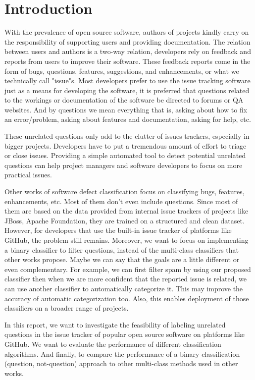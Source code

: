 \documentclass[conference]{IEEEtran}
\begin{document}
\section{Introduction}
With the prevalence of open source software, authors of projects kindly carry on 
the responsibility of supporting users and providing documentation. The relation 
between users and authors is a two-way relation, developers rely on feedback and reports from 
users to improve their software. These feedback reports come in the form of bugs, questions, 
features, suggestions, and enhancements, or what we technically call "issue"s. Most developers
prefer to use the issue tracking software just as a means for developing the software, it is preferred 
that questions related to the workings or documentation of the software be directed to forums or QA
websites. And by questions we mean everything that is, asking about how to fix an error/problem, 
asking about features and documentation, asking for help, etc.

These unrelated questions only add to the clutter of issues trackers, especially in bigger projects.
Developers have to put a tremendous amount of effort to triage or close issues. Providing a 
simple automated tool to detect potential unrelated questions can help project managers 
and software developers to focus on more practical issues.

Other works of software defect classification focus on classifying bugs, 
features, enhancements, etc. Most of them don't even include questions. Since most of them are 
based on the data provided from internal issue trackers of projects like JBoss, Apache Foundation, they are
trained on a structured and clean dataset. However, for developers that use the built-in issue tracker
of platforms like GitHub, the problem still remains. Moreover, we want to focus on implementing 
a binary classifier to filter questions, instead of the multi-class classifiers that other 
works propose. Maybe we can say that the goals are a little different or even complementary. 
For example, we can first filter spam by using our proposed classifier then when 
we are more confident that the reported issue is related, we can use another classifier to 
automatically categorize it. This may improve the accuracy of automatic categorization too. Also, this 
enables deployment of those classifiers on a broader range of projects.

In this report, we want to investigate the feasibility of labeling unrelated questions
in the issue tracker of popular open source software on platforms like GitHub. We want to evaluate the performance
of different classification algorithms. And finally, to compare the performance of a binary classification 
(question, not-question) approach to other multi-class methods used in other works.
\end{document}
